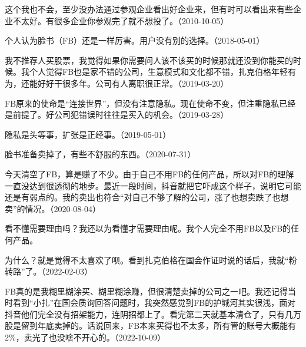 
这个我也不会，至少没办法通过参观企业看出好企业来，但有时可以看出来有些企业不太好。有很多企业你参观完了就不想投了。（2010-10-05）



个人认为脸书（FB）还是一样厉害。用户没有别的选择。（2018-05-01）


我不推荐人买股票，我觉得如果你需要问人该不该买的时候那就还没到你能买的时候。我个人觉得FB也是家不错的公司，生意模式和文化都不错，扎克伯格年轻有为，还能好好干很多年。公司有人离职很正常。（2019-03-20）


FB原来的使命是“连接世界”，但没有注意隐私。现在使命不变，但注重隐私已经是前提了。好公司犯错误时往往是买入的机会。（2019-03-28）

隐私是头等事，扩张是正经事。（2019-05-01）

脸书准备卖掉了，有些不舒服的东西。（2020-07-31）

今天清空了FB，算是赚了不少。由于自己不用FB的任何产品，所以对FB的理解一直没达到很透彻的地步。最近一段时间，抖音就把它吓成这个样子，说明它可能还是有弱点的。我的卖出也符合“对自己不够了解的公司，涨了也想卖跌了也想卖”的情况。（2020-08-04）


看不懂需要理由吗？我还以为看懂才需要理由呢。我个人完全不用FB以及FB的任何产品。


为什么？就是觉得不太喜欢了呗。看到扎克伯格在国会作证时说的话后，我就“粉转路”了。（2022-02-03）

FB真的是我糊里糊涂买、糊里糊涂赚，但很清楚卖掉的公司之一吧。我还记得当时看到“小扎”在国会质询回答问题时，我突然感觉到FB的护城河其实很浅，面对抖音他们完全没有招架能力，连阴招都上了。看完第二天就基本清仓了，只有几万股是留到年底卖掉的。话说回来，FB本来买得也不太多，所有管的账号大概能有2\%，卖光了也没啥不开心的。（2022-10-09）

